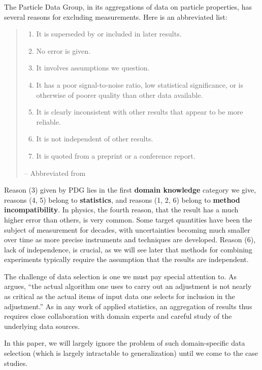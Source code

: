\documentclass[letterpaper,12pt]{article}
\begin{document}
The Particle Data Group, in its aggregations of data on particle properties, has several reasons for excluding measurements. Here is an abbreviated list:

\begin{quote}
  \begin{enumerate}
  \item It is superseded by or included in later results.
  \item No error is given.
  \item It involves assumptions we question.
  \item It has a poor signal-to-noise ratio, low statistical significance, or is otherwise of poorer quality than other data available.
  \item It is clearly inconsistent with other results that appear to be more reliable.
  \item It is not independent of other results.
  \item It is quoted from a preprint or a conference report.
  \end{enumerate} \hfill -- Abbreviated from \citet[Section 5.1]{navas2024review}
\end{quote}

Reason (3) given by PDG lies in the first \textbf{domain knowledge} category we give, reasons (4, 5) belong to \textbf{statistics}, and reasons (1, 2, 6) belong to \textbf{method incompatibility}. In physics, the fourth reason, that the result has a much higher error than others, is very common. Some target quantities have been the subject of measurement for decades, with uncertainties becoming much smaller over time as more precise instruments and techniques are developed. Reason (6), lack of independence, is crucial, as we will see later that methods for combining experiments typically require the assumption that the results are independent.

The challenge of data selection is one we must pay special attention to. As \citet{taylor1982numerical} argues, ``the actual algorithm one uses to carry out an adjustment is not nearly as critical as the actual items of input data one selects for inclusion in the adjustment.'' As in any work of applied statistics, an aggregation of results thus requires close collaboration with domain experts and careful study of the underlying data sources.

In this paper, we will largely ignore the problem of such domain-specific data selection (which is largely intractable to generalization) until we come to the case studies.
\end{document}
